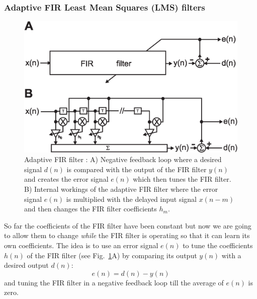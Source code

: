 \documentclass[12pt,a4paper]{article}
\begin{document}
\subsubsection{Adaptive FIR Least Mean Squares (LMS) filters}
\begin{figure}[!hbt]
\begin{center}
\mbox{\includegraphics[width=\linewidth]{fir_lms}}
\caption{Adaptive FIR filter \label{fir_lms}: A) Negative feedback
  loop where a desired signal $d(n)$ is compared with the output
  of the FIR filter $y(n)$ and creates the error signal $e(n)$ which
  then tunes the FIR filter. B) Internal workings of the adaptive FIR
  filter where the error signal $e(n)$ is multiplied with the delayed input signal
  $x(n-m)$ and then changes the FIR filter coefficients $h_m$.}
\end{center}
\end{figure}
So far the coefficients of the FIR filter have been constant but now
we are going to allow them to change \textsl{while} the FIR filter is
operating so that it can learn its own coefficients. The
idea is to use an error signal $e(n)$ to tune the coefficients $h(n)$
of the FIR filter (see Fig.~\ref{fir_lms}A) by comparing its output
$y(n)$ with a desired output $d(n)$:
\begin{equation}
  e(n) = d(n) - y(n) \label{lmserror}
\end{equation}
and tuning the FIR filter in a negative feedback loop till the
average of $e(n)$ is zero.
\end{document}
